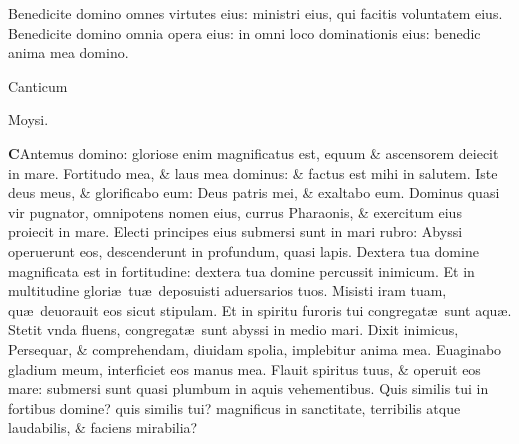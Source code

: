 \documentclass[a5paper,10pt]{book}
\def\ae{æ}
\begin{document}
\begin{multicols*}{2}
\newline \color{red} B\color{black}enedicite domino omnes virtutes eius: ministri eius, qui facitis voluntatem eius.
\newline \color{red} B\color{black}enedicite domino omnia opera eius: in omni loco dominationis eius: benedic anima mea domino.
\vspace{-1em}
\begin{center} \color{red}
\hypertarget{Exodus}{Canticum} Moysi.
\end{center}
\vspace{-1em}
\lettrine[lines=2]{\bfseries \color{red} C}{}Antemus domino: gloriose enim magnificatus est, equum \& ascensorem deiecit in mare.
\newline \color{red} F\color{black}ortitudo mea, \& laus mea dominus: \& factus est mihi in salutem.
\newline \color{red} I\color{black}ste deus meus, \& glorificabo eum: Deus patris mei, \& exaltabo eum.
\newline \color{red} D\color{black}ominus quasi vir pugnator, omnipotens nomen eius, currus Pharaonis, \& exercitum eius proiecit in mare.
\newline \color{red} E\color{black}lecti principes eius submersi sunt in mari rubro: Abyssi operuerunt eos, descenderunt in profundum, quasi lapis.
\newline \color{red} D\color{black}extera tua domine magnificata est in fortitudine: dextera tua domine percussit inimicum.
\newline \color{red} E\color{black}t in multitudine glori\ae \ tu\ae \ deposuisti aduersarios tuos.
\newline \color{red} M\color{black}isisti iram tuam, qu\ae \ deuorauit eos sicut stipulam. Et in spiritu furoris tui congregat\ae \ sunt aqu\ae .
\newline \color{red} S\color{black}tetit vnda fluens, congregat\ae \ sunt abyssi in medio mari.
\newline \color{red} D\color{black}ixit inimicus, Persequar, \& comprehendam, diuidam spolia, implebitur anima mea.
\newline \color{red} E\color{black}uaginabo gladium meum, interficiet eos manus mea.
\newline \color{red} F\color{black}lauit spiritus tuus, \& operuit eos mare: submersi sunt quasi plumbum in aquis vehementibus.
\newline \color{red} Q\color{black}uis similis tui in fortibus domine? quis similis tui? magnificus in sanctitate, terribilis atque laudabilis, \& faciens mirabilia?

\end{multicols*}
\end{document}
